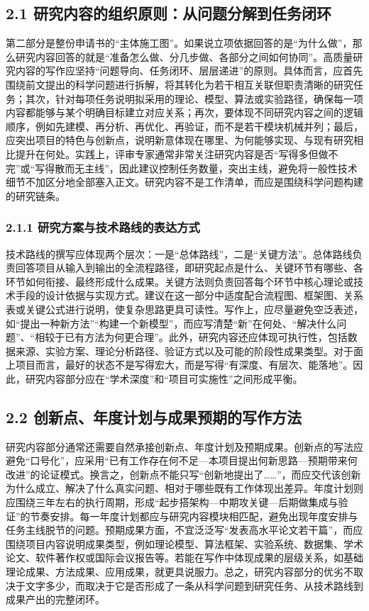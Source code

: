 \documentclass[12pt,UTF8,AutoFakeBold=2,a4paper]{ctexart}
\begin{document}
	\subsection{2.1 研究内容的组织原则：从问题分解到任务闭环}
	
	第二部分是整份申请书的“主体施工图”。如果说立项依据回答的是“为什么做”，那么研究内容回答的就是“准备怎么做、分几步做、各部分之间如何协同”。高质量研究内容的写作应坚持“问题导向、任务闭环、层层递进”的原则。具体而言，应首先围绕前文提出的科学问题进行拆解，将其转化为若干相互关联但职责清晰的研究任务；其次，针对每项任务说明拟采用的理论、模型、算法或实验路径，确保每一项内容都能够与某个明确目标建立对应关系；再次，要体现不同研究内容之间的逻辑顺序，例如先建模、再分析、再优化、再验证，而不是若干模块机械并列；最后，应突出项目的特色与创新点，说明新意体现在哪里、为何能够实现、与现有研究相比提升在何处。实践上，评审专家通常非常关注研究内容是否“写得多但做不完”或“写得散而无主线”，因此建议控制任务数量，突出主线，避免将一般性技术细节不加区分地全部塞入正文。研究内容不是工作清单，而应是围绕科学问题构建的研究链条\cite{Porter2007,Lee2022}。
	
	\subsubsection{2.1.1 研究方案与技术路线的表达方式}
	
	技术路线的撰写应体现两个层次：一是“总体路线”，二是“关键方法”。总体路线负责回答项目从输入到输出的全流程路径，即研究起点是什么、关键环节有哪些、各环节如何衔接、最终形成什么成果。关键方法则负责回答每个环节中核心理论或技术手段的设计依据与实现方式。建议在这一部分中适度配合流程图、框架图、关系表或关键公式进行说明，使复杂思路更具可读性。写作上，应尽量避免空泛表述，如“提出一种新方法”“构建一个新模型”，而应写清楚“新”在何处、“解决什么问题”、“相较于已有方法为何更合理”。此外，研究内容还应体现可执行性，包括数据来源、实验方案、理论分析路径、验证方式以及可能的阶段性成果类型。对于面上项目而言，最好的状态不是写得宏大，而是写得“有深度、有层次、能落地”。因此，研究内容部分应在“学术深度”和“项目可实施性”之间形成平衡\cite{Bromham2016,Fang2016}。
	
	\subsection{2.2 创新点、年度计划与成果预期的写作方法}
	
	研究内容部分通常还需要自然承接创新点、年度计划及预期成果。创新点的写法应避免“口号化”，应采用“已有工作存在何不足—本项目提出何新思路—预期带来何改进”的论证模式。换言之，创新点不能只写“创新地提出了……”，而应交代该创新为什么成立、解决了什么真实问题、相对于哪些既有工作体现出差异。年度计划则应围绕三年左右的执行周期，形成“起步搭架构—中期攻关键—后期做集成与验证”的节奏安排。每一年度计划都应与研究内容模块相匹配，避免出现年度安排与任务主线脱节的问题。预期成果方面，不宜泛泛写“发表高水平论文若干篇”，而应围绕项目内容说明成果类型，例如理论模型、算法框架、实验系统、数据集、学术论文、软件著作权或国际会议报告等。若能在写作中体现成果的层级关系，如基础理论成果、方法成果、应用成果，就更具说服力。总之，研究内容部分的优劣不取决于文字多少，而取决于它是否形成了一条从科学问题到研究任务、从技术路线到成果产出的完整闭环\cite{Ioannidis2014,Hoppe2019}。
	
\end{document}

